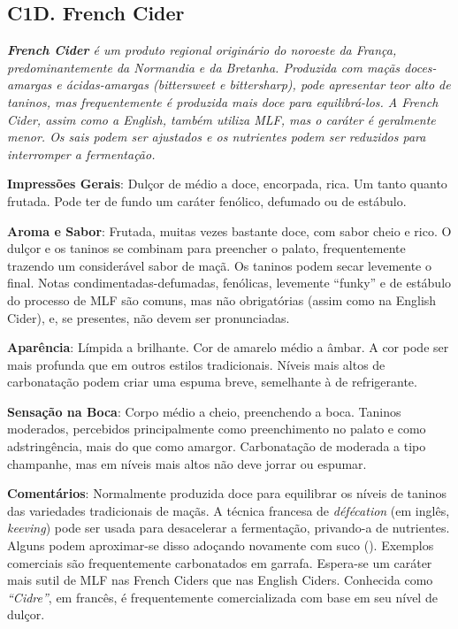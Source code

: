 \subsection*{C1D. French Cider}

\textit{\textbf{French Cider} é um produto regional originário do noroeste da França, predominantemente da Normandia e da Bretanha. Produzida com maçãs doces-amargas e ácidas-amargas (\textit{bittersweet} e \textit{bittersharp}), pode apresentar teor alto de taninos, mas frequentemente é produzida mais doce para equilibrá-los. A French Cider, assim como a English, também utiliza MLF, mas o caráter é geralmente menor. Os sais podem ser ajustados e os nutrientes podem ser reduzidos para interromper a fermentação.}

\textbf{Impressões Gerais}: Dulçor de médio a doce, encorpada, rica. Um tanto quanto frutada. Pode ter de fundo um caráter fenólico, defumado ou de estábulo.

\textbf{Aroma e Sabor}: Frutada, muitas vezes bastante doce, com sabor cheio e rico. O dulçor e os taninos se combinam para preencher o palato, frequentemente trazendo um considerável sabor de maçã. Os taninos podem secar levemente o final. Notas condimentadas-defumadas, fenólicas, levemente “funky” e de estábulo do processo de MLF são comuns, mas não obrigatórias (assim como na English Cider), e, se presentes, não devem ser pronunciadas.

\textbf{Aparência}: Límpida a brilhante. Cor de amarelo médio a âmbar. A cor pode ser mais profunda que em outros estilos tradicionais. Níveis mais altos de carbonatação podem criar uma espuma breve, semelhante à de refrigerante.

\textbf{Sensação na Boca}: Corpo médio a cheio, preenchendo a boca. Taninos moderados, percebidos principalmente como preenchimento no palato e como adstringência, mais do que como amargor. Carbonatação de moderada a tipo champanhe, mas em níveis mais altos não deve jorrar ou espumar.

\textbf{Comentários}: Normalmente produzida doce para equilibrar os níveis de taninos das variedades tradicionais de maçãs. A técnica francesa de \textit{défécation} (em inglês, \textit{keeving}) pode ser usada para desacelerar a fermentação, privando-a de nutrientes. Alguns podem aproximar-se disso adoçando novamente com suco (). Exemplos comerciais são frequentemente carbonatados em garrafa. Espera-se um caráter mais sutil de MLF nas French Ciders que nas English Ciders. Conhecida como \textit{“Cidre”}, em francês, é frequentemente comercializada com base em seu nível de dulçor.

